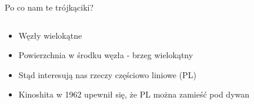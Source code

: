 \begin{frame}{Po co nam te trójkąciki?}
  \begin{columns}
    \begin{column}{0.5\textwidth}
      \begin{itemize}\setlength{\itemsep}{1em}
        \item Węzły wielokątne
        \item Powierzchnia w środku węzła - brzeg wielokątny
        \item Stąd interesują nas rzeczy częściowo liniowe (PL)
        \item Kinoshita w 1962 upewnił się, że PL można zamieść pod dywan
      \end{itemize}
    \end{column}
    \begin{column}{0.5\textwidth}
    \end{column}
  \end{columns}

\end{frame}
